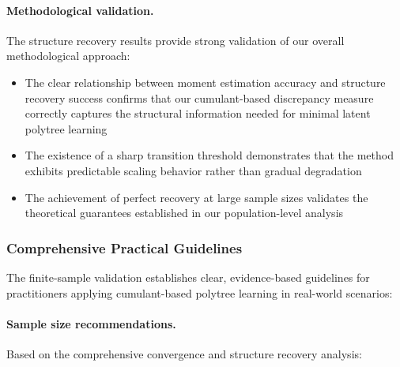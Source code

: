 \documentclass[11pt,a4paper]{article}
\numberwithin{equation}{section}
\begin{document}
\paragraph{Methodological validation.} The structure recovery results provide strong validation of our overall methodological approach:

\begin{itemize}
\item The clear relationship between moment estimation accuracy and structure recovery success confirms that our cumulant-based discrepancy measure correctly captures the structural information needed for minimal latent polytree learning
\item The existence of a sharp transition threshold demonstrates that the method exhibits predictable scaling behavior rather than gradual degradation
\item The achievement of perfect recovery at large sample sizes validates the theoretical guarantees established in our population-level analysis
\end{itemize}

\subsubsection{Comprehensive Practical Guidelines}

The finite-sample validation establishes clear, evidence-based guidelines for practitioners applying cumulant-based polytree learning in real-world scenarios:

\paragraph{Sample size recommendations.} Based on the comprehensive convergence and structure recovery analysis:
\end{document}
